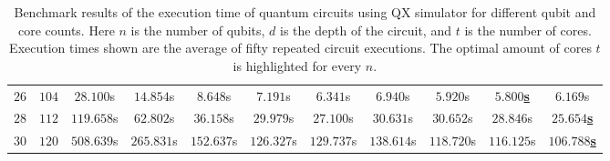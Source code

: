 \begin{table}[ht]
\begin{adjustwidth}{-0.35cm}{-0.35cm}
{\begin{tabular}{ccccccccccc}
            $26$ & $104$ & $28.100$s & $14.854$s & $8.648$s & $7.191$s & $6.341$s & $6.940$s & $5.920$s & \underline{$\mathbf{5.800}$\textbf{s}} & $6.169$s \\
            $28$ & $112$ & $119.658$s & $62.802$s & $36.158$s & $29.979$s & $27.100$s & $30.631$s & $30.652$s & $28.846$s & \underline{$\mathbf{25.654}$\textbf{s}} \\
            $30$ & $120$ & $508.639$s & $265.831$s & $152.637$s & $126.327$s & $129.737$s & $138.614$s & $118.720$s & $116.125$s & \underline{$\mathbf{106.788}$\textbf{s}} \\
        \end{tabular}
    }
    \end{adjustwidth}
    \caption[Benchmark results of the execution time of quantum circuits using QX simulator for different qubit and core counts.]{
        Benchmark results of the execution time of quantum circuits using QX simulator for different qubit and core counts.
        Here $n$ is the number of qubits, $d$ is the depth of the circuit, and $t$ is the number of cores.
        Execution times shown are the average of fifty repeated circuit executions.
        The optimal amount of cores $t$ is highlighted for every $n$.
    }
\end{table}